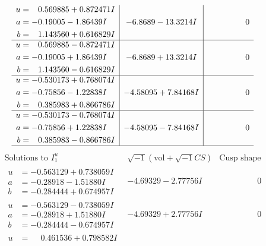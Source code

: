 \documentclass[1p]{elsarticle_modified}
\theoremstyle{definition}
\newcommand{\I}{\sqrt{-1}}
\begin{document}
$$\begin{array}{c|c|c}
\begin{aligned}
u &= \phantom{-}0.569885 + 0.872471 I \\
a &= -0.19005 - 1.86439 I \\
b &= \phantom{-}1.143560 + 0.616829 I\end{aligned}
 & -6.8689 - 13.3214 I & \phantom{-0.000000 } 0 \\ \hline\begin{aligned}
u &= \phantom{-}0.569885 - 0.872471 I \\
a &= -0.19005 + 1.86439 I \\
b &= \phantom{-}1.143560 - 0.616829 I\end{aligned}
 & -6.8689 + 13.3214 I & \phantom{-0.000000 } 0 \\ \hline\begin{aligned}
u &= -0.530173 + 0.768074 I \\
a &= -0.75856 - 1.22838 I \\
b &= \phantom{-}0.385983 + 0.866786 I\end{aligned}
 & -4.58095 + 7.84168 I & \phantom{-0.000000 } 0 \\ \hline\begin{aligned}
u &= -0.530173 - 0.768074 I \\
a &= -0.75856 + 1.22838 I \\
b &= \phantom{-}0.385983 - 0.866786 I\end{aligned}
 & -4.58095 - 7.84168 I & \phantom{-0.000000 } 0\\
 \hline 
 \end{array}$$\newpage$$\begin{array}{c|c|c}  
\text{Solutions to }I^u_{1}& \I (\text{vol} + \sqrt{-1}CS) & \text{Cusp shape}\\
 \hline 
\begin{aligned}
u &= -0.563129 + 0.738059 I \\
a &= -0.28918 - 1.51880 I \\
b &= -0.284444 + 0.674957 I\end{aligned}
 & -4.69329 - 2.77756 I & \phantom{-0.000000 } 0 \\ \hline\begin{aligned}
u &= -0.563129 - 0.738059 I \\
a &= -0.28918 + 1.51880 I \\
b &= -0.284444 - 0.674957 I\end{aligned}
 & -4.69329 + 2.77756 I & \phantom{-0.000000 } 0 \\ \hline\begin{aligned}
u &= \phantom{-}0.461536 + 0.798582 I \\

\end{aligned}
\end{array}$$
\end{document}
